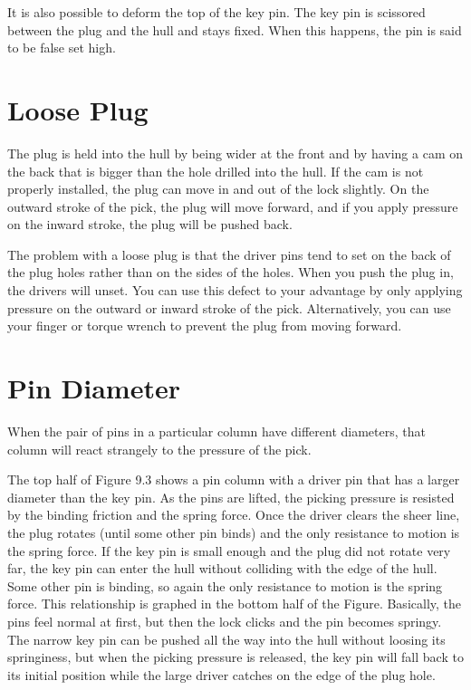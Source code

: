 It is also possible to deform the top of the key pin. The key pin is scissored between the 
plug and the hull and stays fixed. When this happens, the pin is said to be false set high.

\section{Loose Plug }
The plug is held into the hull by being wider at the front and by having a cam on the back 
that is bigger than the hole drilled into the hull. If the cam is not properly installed, the 
plug can move in and out of the lock slightly. On the outward stroke of the pick, the plug 
will move forward, and if you apply pressure on the inward stroke, the plug will be pushed 
back. 

The problem with a loose plug is that the driver pins tend to set on the back of the plug 
holes rather than on the sides of the holes. When you push the plug in, the drivers will 
unset. You can use this defect to your advantage by only applying pressure on the outward 
or inward stroke of the pick. Alternatively, you can use your finger or torque wrench to 
prevent the plug from moving forward. 

\section{Pin Diameter}
When the pair of pins in a particular column have different diameters, that column will react 
strangely to the pressure of the pick. 

The top half of Figure 9.3 shows a pin column with a driver pin that has a larger diameter 
than the key pin. As the pins are lifted, the picking pressure is resisted by the binding friction 
and the spring force. Once the driver clears the sheer line, the plug rotates (until some other 
pin binds) and the only resistance to motion is the spring force. If the key pin is small enough 
and the plug did not rotate very far, the key pin can enter the hull without colliding with 
the edge of the hull. Some other pin is binding, so again the only resistance to motion is the 
spring force. This relationship is graphed in the bottom half of the Figure. Basically, the 
pins feel normal at first, but then the lock clicks and the pin becomes springy. The narrow 
key pin can be pushed all the way into the hull without loosing its springiness, but when the 
picking pressure is released, the key pin will fall back to its initial position while the large 
driver catches on the edge of the plug hole. 

